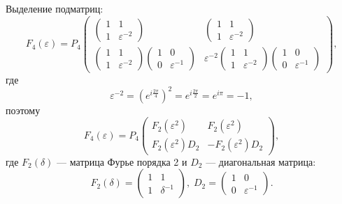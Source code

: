 Выделение подматриц:
\[
    F_4(\varepsilon)
    = P_4 \begin{pmatrix}
        \begin{pmatrix}
            1 & 1                \\
            1 & \varepsilon^{-2}
        \end{pmatrix}
         &
        \begin{pmatrix}
            1 & 1                \\
            1 & \varepsilon^{-2}
        \end{pmatrix} \\
        \begin{pmatrix}
            1 & 1                \\
            1 & \varepsilon^{-2}
        \end{pmatrix}
        \begin{pmatrix}
            1 & 0                \\
            0 & \varepsilon^{-1}
        \end{pmatrix}
         &
        \varepsilon^{-2}
        \begin{pmatrix}
            1 & 1                \\
            1 & \varepsilon^{-2}
        \end{pmatrix}
        \begin{pmatrix}
            1 & 0                \\
            0 & \varepsilon^{-1}
        \end{pmatrix}
    \end{pmatrix} ,
\]
где
\[
    \varepsilon^{-2}
    = \left( e^{i \frac{2 \pi}{4}} \right)^2
    = e^{i \frac{2 \pi}{2}}
    = e^{i \pi}
    = -1 ,
\]
поэтому
\[
    F_4(\varepsilon)
    = P_4
    \begin{pmatrix}
        F_2(\varepsilon^2)     & F_2(\varepsilon^2)       \\
        F_2(\varepsilon^2) D_2 & - F_2(\varepsilon^2) D_2
    \end{pmatrix} ,
\]
где $F_2(\delta)$ --- матрица Фурье порядка 2 и $D_2$ --- диагональная матрица:
\[
    F_2(\delta)
    = \begin{pmatrix}
        1 & 1           \\
        1 & \delta^{-1}
    \end{pmatrix} ,
    \;
    D_2
    = \begin{pmatrix}
        1 & 0                \\
        0 & \varepsilon^{-1}
    \end{pmatrix} .
\]
